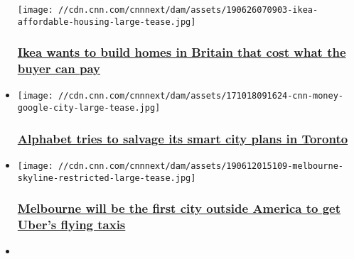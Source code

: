 \begin{itemize}
  \texttt{[image: //cdn.cnn.com/cnnnext/dam/assets/190626070903-ikea-affordable-housing-large-tease.jpg]}

  \hypertarget{ikea-wants-to-build-homes-in-britain-that-cost-what-the-buyer-can-pay}{%
  \subsubsection{\texorpdfstring{\href{/2019/06/26/business/ikea-affordable-housing/index.html}{Ikea
  wants to build homes in Britain that cost what the buyer can
  pay}}{Ikea wants to build homes in Britain that cost what the buyer can pay}}\label{ikea-wants-to-build-homes-in-britain-that-cost-what-the-buyer-can-pay}}
\item
  \href{/2019/06/24/tech/sidewalk-labs-toronto-plan/index.html}{}

  \texttt{[image: //cdn.cnn.com/cnnnext/dam/assets/171018091624-cnn-money-google-city-large-tease.jpg]}

  \hypertarget{alphabet-tries-to-salvage-its-smart-city-plans-in-toronto-}{%
  \subsubsection{\texorpdfstring{\href{/2019/06/24/tech/sidewalk-labs-toronto-plan/index.html}{Alphabet
  tries to salvage its smart city plans in Toronto
  }}{Alphabet tries to salvage its smart city plans in Toronto }}\label{alphabet-tries-to-salvage-its-smart-city-plans-in-toronto-}}
\item
  \href{/2019/06/12/tech/uber-melbourne-flying-taxis/index.html}{}

  \texttt{[image: //cdn.cnn.com/cnnnext/dam/assets/190612015109-melbourne-skyline-restricted-large-tease.jpg]}

  \hypertarget{melbourne-will-be-the-first-city-outside-america-to-get-ubers-flying-taxis}{%
  \subsubsection{\texorpdfstring{\href{/2019/06/12/tech/uber-melbourne-flying-taxis/index.html}{Melbourne
  will be the first city outside America to get Uber's flying
  taxis}}{Melbourne will be the first city outside America to get Uber's flying taxis}}\label{melbourne-will-be-the-first-city-outside-america-to-get-ubers-flying-taxis}}
\item
  \href{/videos/business/2019/05/30/lab-meat-innovative-cities-vision.cnn-business}{}


\end{itemize}
